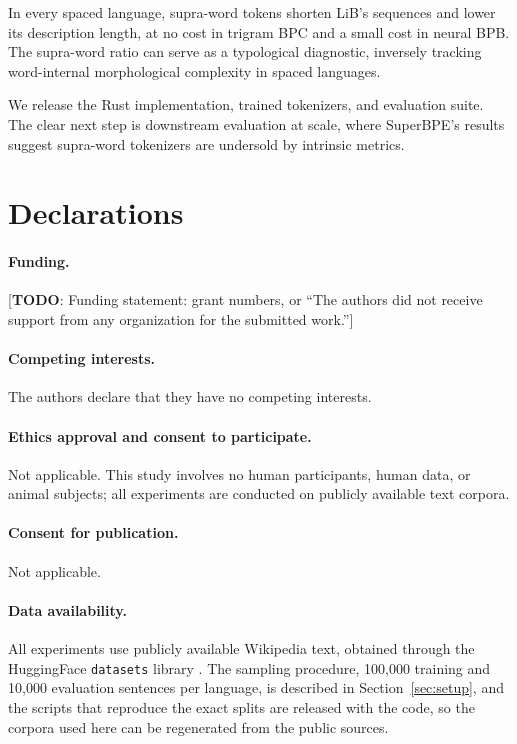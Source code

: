 \documentclass[pdflatex,sn-apa]{sn-jnl}
\newcommand{\todo}[1]{\textcolor{todocolor}{[\textbf{TODO}: #1]}}
\begin{document}
In every spaced language, supra-word tokens shorten LiB's sequences and
lower its description length, at no cost in trigram BPC and a small cost in
neural BPB. The supra-word ratio can serve as a typological diagnostic,
inversely
tracking word-internal morphological complexity in spaced languages.

We release the Rust implementation, trained tokenizers, and evaluation
suite. The clear next step is downstream evaluation at scale, where
SuperBPE's results suggest supra-word tokenizers are undersold by intrinsic
metrics.


\section*{Declarations}

\paragraph{Funding.}
\todo{Funding statement: grant numbers, or ``The authors did not receive
support from any organization for the submitted work.''}

\paragraph{Competing interests.}
The authors declare that they have no competing interests.

\paragraph{Ethics approval and consent to participate.}
Not applicable. This study involves no human participants, human data, or
animal subjects; all experiments are conducted on publicly available text
corpora.

\paragraph{Consent for publication.}
Not applicable.

\paragraph{Data availability.}
All experiments use publicly available Wikipedia text, obtained through the
HuggingFace \texttt{datasets} library \citep{lhoest2021datasets}. The
sampling procedure, 100,000 training and 10,000 evaluation sentences per
language, is described in Section~\ref{sec:setup}, and the scripts that
reproduce the exact splits are released with the code, so the corpora used
here can be regenerated from the public sources.
\end{document}
